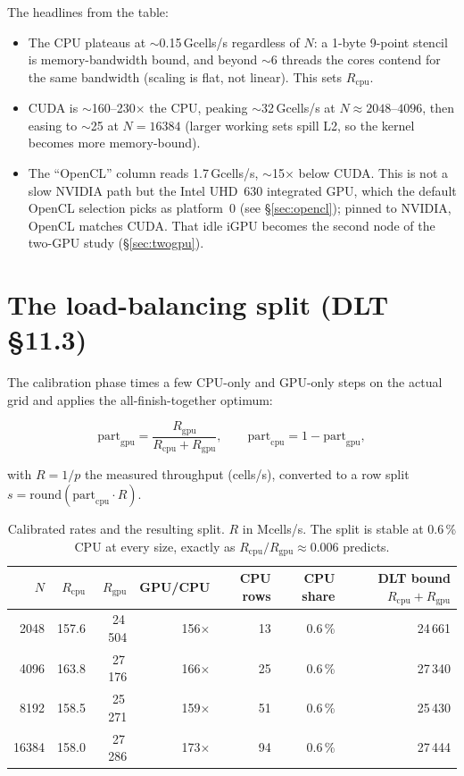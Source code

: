 \documentclass[
	english,
	letterpaper, oneside
]{article}
\begin{document}
The headlines from the table:

\begin{itemize}
	\item The CPU plateaus at $\sim$0.15\,Gcells/s regardless of $N$: a 1-byte
	9-point stencil is memory-bandwidth bound, and beyond $\sim$6 threads the cores
	contend for the same bandwidth (scaling is flat, not linear). This sets
	$R_\mathrm{cpu}$.
	\item CUDA is $\sim$160--230$\times$ the CPU, peaking $\sim$32\,Gcells/s at
	$N\approx2048$--$4096$, then easing to $\sim$25 at $N=16384$ (larger working sets
	spill L2, so the kernel becomes more memory-bound).
	\item The ``OpenCL'' column reads 1.7\,Gcells/s, $\sim$15$\times$ below CUDA. This is
	not a slow NVIDIA path but the Intel UHD~630 integrated GPU, which the default OpenCL
	selection picks as platform~0 (see \S\ref{sec:opencl}); pinned to NVIDIA, OpenCL
	matches CUDA. That idle iGPU becomes the second node of the two-GPU study
	(\S\ref{sec:twogpu}).
\end{itemize}

\section{The load-balancing split (DLT \S11.3)}
\label{sec:split}

The calibration phase times a few CPU-only and GPU-only steps on the actual grid
and applies the all-finish-together optimum:

\begin{equation}
	\label{eq:dlt}
	\text{part}_\mathrm{gpu} = \frac{R_\mathrm{gpu}}{R_\mathrm{cpu} + R_\mathrm{gpu}},
	\qquad
	\text{part}_\mathrm{cpu} = 1 - \text{part}_\mathrm{gpu},
\end{equation}

\noindent with $R = 1/p$ the measured throughput (cells/s), converted to a row split
$s = \text{round}(\text{part}_\mathrm{cpu}\cdot R)$.

\begin{table}[H]
	\centering
	\caption{Calibrated rates and the resulting split. $R$ in Mcells/s. The split is
	stable at 0.6\,\% CPU at every size, exactly as $R_\mathrm{cpu}/R_\mathrm{gpu}
	\approx 0.006$ predicts.}
	\label{tab:split}
	\begin{tabular}{@{}rrrrrrr@{}}
		\toprule
		$N$ & $R_\mathrm{cpu}$ & $R_\mathrm{gpu}$ & GPU/CPU & CPU rows & CPU share & DLT bound $R_\mathrm{cpu}{+}R_\mathrm{gpu}$ \\
		\midrule
		2048  & 157.6 & 24\,504 & 156$\times$ & 13 & 0.6\,\% & 24\,661 \\
		4096  & 163.8 & 27\,176 & 166$\times$ & 25 & 0.6\,\% & 27\,340 \\
		8192  & 158.5 & 25\,271 & 159$\times$ & 51 & 0.6\,\% & 25\,430 \\
		16384 & 158.0 & 27\,286 & 173$\times$ & 94 & 0.6\,\% & 27\,444 \\
		\bottomrule
	\end{tabular}
\end{table}
\end{document}
